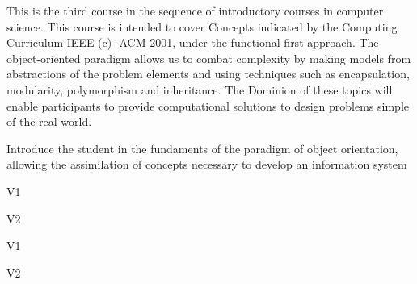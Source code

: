 \begin{syllabus}


\begin{justification}
This is the third course in the sequence of introductory courses in computer science. This course is intended to cover
Concepts indicated by the Computing Curriculum IEEE (c) -ACM 2001, under the functional-first approach.
The object-oriented paradigm allows us to combat complexity by making models from abstractions of the problem elements and using techniques such as encapsulation, modularity, polymorphism and inheritance.
The Dominion  of these topics will enable participants to provide computational solutions to design problems simple of the real world.
\end{justification}

\begin{goals}
\item Introduce the student in the fundaments of the paradigm of object orientation, allowing the assimilation of concepts necessary to develop an information system
\end{goals}

\begin{outcomes}{V1}
    \item {}
    \item {}
    \item {}
\end{outcomes}

\begin{outcomes}{V2}
    \item {}
    \item {}
    \item {}
\end{outcomes}

\begin{competences}{V1}
    \item {} 
    \item {} 
    \item {}
    \item {} 
    \item {}
\end{competences}

\begin{competences}{V2}
    \item {} 
    \item {} 
    \item {}
    \item {} 
    \item {}
\end{competences}


\end{syllabus}
